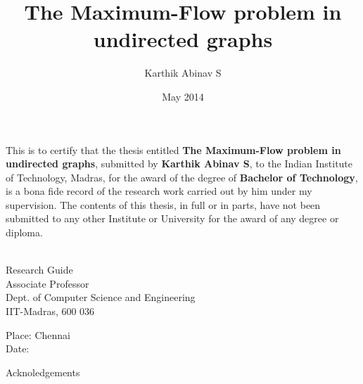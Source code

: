 \documentclass[BTech]{iitmdiss}
\def\thesistitle{The Maximum-Flow problem in undirected graphs}
\def\thesisauthor{Karthik Abinav S}
\begin{document}


\title{\thesistitle}

\author{\thesisauthor}

\date{May 2014}

\begin{singlespace}
\maketitle 
\end{singlespace} 



\certificate

\vspace*{0.5in}

\noindent This is to certify that the thesis entitled {\bf {\thesistitle}}, 
submitted by {\bf {\thesisauthor}}, to the Indian Institute of Technology, 
Madras, for the award of the degree of {\bf Bachelor of Technology}, 
is a bona fide record of the research work carried out by him under my
supervision. The contents of this thesis, in full or in parts, have not been
submitted to any other Institute or University for the award of any degree or
diploma.

\vspace*{1.4in}
\hspace*{-0.25in}
\begin{singlespace}
 \\
\noindent Research Guide \\ 
\noindent Associate Professor \\
\noindent Dept. of Computer Science and Engineering\\
\noindent IIT-Madras, 600 036 \\
\end{singlespace}
\vspace*{0.20in}
\noindent Place: Chennai\\ 
Date:

\acknowledgements


Acknoledgements

\end{document}
